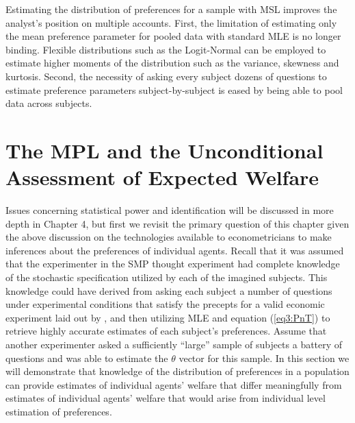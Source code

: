 \documentclass[../main.tex]{subfiles}
\begin{document}
Estimating the distribution of preferences for a sample with MSL improves the analyst's position on multiple accounts.
First, the limitation of estimating only the mean preference parameter for pooled data with standard MLE is no longer binding.
Flexible distributions such as the Logit-Normal{\footnotemark} can be employed to estimate higher moments of the distribution such as the variance, skewness and kurtosis.
Second, the necessity of asking every subject dozens of questions to estimate preference parameters subject-by-subject is eased by being able to pool data across subjects.

\addtocounter{footnote}{-1}

\section{The \texorpdfstring{\textcite{Holt2002}}{Holt and Laury (2002)} MPL and the Unconditional Assessment of Expected Welfare}

Issues concerning statistical power and identification will be discussed in more depth in Chapter 4, but first we revisit the primary question of this chapter given the above discussion on the technologies available to econometricians to make inferences about the preferences of individual agents.
Recall that it was assumed that the experimenter in the SMP thought experiment had complete knowledge of the stochastic specification utilized by each of the imagined subjects.
This knowledge could have derived from asking each subject a number of questions under experimental conditions that satisfy the precepts for a valid economic experiment laid out by \textcite{Smith1982}{\footnotemark}, and then utilizing MLE and equation (\ref{eq3:PnT}) to retrieve highly accurate estimates of each subject's preferences.
Assume that another experimenter asked a sufficiently \enquote{large} sample of subjects a battery of questions and was able to estimate the $\theta$ vector for this sample.
In this section we will demonstrate that knowledge of the distribution of preferences in a population can provide estimates of individual agents' welfare that differ meaningfully from estimates of individual agents' welfare that would arise from individual level estimation of preferences.
\end{document}
